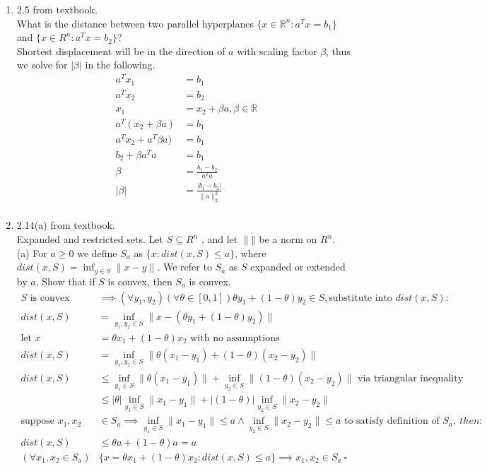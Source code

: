 \documentclass[12pt,letter]{article}
\newcommand{\R}{\mathbb{R}}
\newcommand{\norm}[1]{\|#1\|}
\newcommand{\set}[1]{\{#1\}}
\begin{document}
\begin{enumerate}
\item 2.5 from textbook.\\
  What is the distance between two parallel hyperplanes $\{x \in \R^n : a^Tx = b_1 \}$ and $\{x \in R^n : a^T x = b_2 \}$?\\
  Shortest displacement will be in the direction of $a$ with scaling factor $\beta$, thus we solve for $|\beta|$ in the following.
  \begin{align*}
    a^T x_1 &= b_1\\
    a^T x_2 &= b_2\\
    x_1 &= x_2 + \beta a, \beta \in \R\\
    a^T (x_2+\beta a) &= b_1\\
    a^T x_2+ a^T \beta a) &= b_1\\
    b_2 + \beta a^T a &= b_1\\
    \beta &= \frac{b_1-b_2}{a^T a}\\
    |\beta| &= \frac{|b_1-b_2|}{\norm{a}_2^2}\\
  \end{align*}
  
\item 2.14(a) from textbook.\\
  Expanded and restricted sets. Let $S \subseteq R^n$ , and let $\norm{\dot}$ be a norm on $R^n$.\\
  (a) For $a \geq 0$ we define $S_a$ as $\{x : dist(x, S) \leq a\}$, where $dist(x, S) = \inf_{y\in S} \norm{x-y}$. We refer to $S_a$ as $S$ expanded or extended by $a$. Show that if $S$ is convex, then $S_a$ is convex.
  \begin{align*}
    S \text{ is convex} &\implies (\forall y_1, y_2) (\forall \theta \in [0,1]) \theta y_1 + (1-\theta) y_2 \in S, \text{substitute into }dist(x,S):\\
    dist(x,S) &= \inf_{y_1,y_2 \in S} \norm{x-(\theta y_1 + (1-\theta) y_2)}\\
    \text{let } x &= \theta x_1 + (1-\theta) x_2 \text{ with no assumptions}\\
    dist(x,S) &= \inf_{y_1,y_2 \in S} \norm{\theta(x_1-y_1) + (1-\theta)(x_2-y_2)}\\
    dist(x,S) &\leq \inf_{y_1\in S}\norm{\theta(x_1-y_1)} + \inf_{y_2 \in S}\norm{(1-\theta)(x_2-y_2)} \text{ via triangular inequality}\\
                        &\leq |\theta| \inf_{y_1\in S}\norm{x_1-y_1} + |(1-\theta)|\inf_{y_2 \in S}\norm{x_2-y_2}\\
    \text{suppose } x_1, x_2 & \in S_a \implies \inf_{y_1\in S}\norm{x_1-y_1} \leq a \wedge \inf_{y_2 \in S}\norm{x_2-y_2} \leq a \text{ to satisfy definition of }S_a,\ then:\\
    dist(x,S) &\leq \theta a + (1-\theta)a=a\\
    (\forall x_1, x_2 \in S_a) & \set{x= \theta x_1 + (1-\theta) x_2 : dist(x, S) \leq a} \implies x_1, x_2 \in S_a\ \square
  \end{align*}
  

\end{enumerate}
\end{document}
